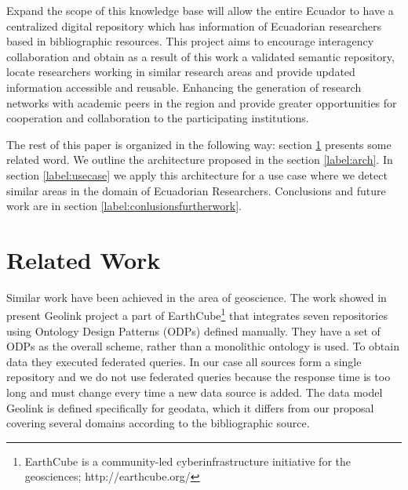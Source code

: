 \documentclass[11pt]{article}
\begin{document}
Expand the scope of this knowledge base will allow the entire Ecuador to have a centralized digital repository which has information of Ecuadorian researchers based in bibliographic resources. This project aims to encourage interagency collaboration and obtain as a result of this work a validated semantic repository, locate researchers working in similar research areas and provide updated information accessible and reusable. Enhancing the generation of research networks with academic peers in the region and provide greater opportunities for cooperation and collaboration to the participating institutions.

The rest of this paper is organized in the following way: section \ref{label:relatedwork} presents some related word. We outline the architecture proposed in the section \ref{label:arch}. In section \ref{label:usecase} we apply this architecture for a use case where we detect similar areas in the domain of Ecuadorian Researchers. %
Conclusions and future work are in section \ref{label:conlusionsfurtherwork}.

\section{Related Work}
\label{label:relatedwork}


Similar work have been achieved in the area of geoscience. The work showed in \cite{Krisnadhi2015TheGF} present Geolink project a part of EarthCube\footnote{EarthCube is a community-led cyberinfrastructure initiative for the geosciences; http://earthcube.org/}  that integrates seven repositories using Ontology Design Patterns (ODPs) \cite{Gangemi2005} defined manually. They have a set of ODPs as the overall scheme, rather than a monolithic ontology is used. To obtain data they executed federated queries. In our case all sources form a single repository and we do not use federated queries because the response time is  too long and must change every time a new data source is added. The data model Geolink is defined specifically for geodata, which it differs from our proposal covering several domains according to the bibliographic source.
\end{document}
